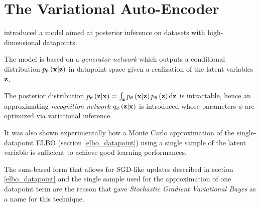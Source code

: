 \section{The Variational Auto-Encoder}

\cite{1312.6114} introduced a model aimed at posterior inference 
on datasets with high-dimensional datapoints.

The model is based on a \emph{generator network} which outputs a conditional
distribution $p_\theta\left(\mathbf{x}|\mathbf{z}\right)$ 
in datapoint-space given a realization of the latent variables $\mathbf{z}$.

The posterior distribution $p_\theta\left(\mathbf{z}|\mathbf{x}\right)=\int_{\mathbf{z}} p_\theta\left(\mathbf{x}|\mathbf{z}\right) p_\theta\left(\mathbf{z}\right) \mathrm{d}\mathbf{z}$ is intractable,
hence an approximating \emph{recognition network}
$q_\phi\left(\mathbf{z}|\mathbf{x}\right)$ is introduced whose parameters $\phi$ are
optimized via variational inference.

It was also shown experimentally how a Monte Carlo approximation of
the single-datapoint ELBO (section \ref{elbo_datapoint})
using a single sample of the latent variable is sufficient to
achieve good learning performances.

The sum-based form that allows for SGD-like updates described in section
\ref{elbo_datapoint}
and
the single sample used for the approximation of one datapoint term
are the reason that \cite{1312.6114}
gave \emph{Stochastic Gradient Variational Bayes} as a name for this technique.
